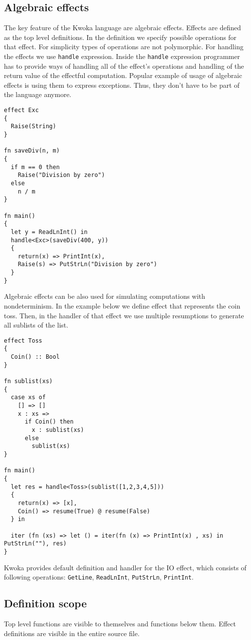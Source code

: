 \documentclass[a4paper]{article}
\begin{document}
\subsection*{Algebraic effects}
The key feature of the Kwoka language are algebraic effects.
Effects are defined as the top level definitions. In the definition we specify possible
operations for that effect. For simplicity types of operations are not polymorphic.
For handling the effects we use \verb+handle+ expression.
Inside the \verb+handle+ expression programmer has to provide ways of handling all of the
effect's operations and handling of the return value of the effectful computation.
Popular example of usage of algebraic effects is using them to
express exceptions. Thus, they don't have to be part of the language anymore.

\begin{verbatim}
effect Exc
{
  Raise(String)
}

fn saveDiv(n, m)
{
  if m == 0 then
    Raise("Division by zero")
  else
    n / m
}

fn main()
{
  let y = ReadLnInt() in
  handle<Exc>(saveDiv(400, y))
  {
    return(x) => PrintInt(x),
    Raise(s) => PutStrLn("Division by zero")
  }
}
\end{verbatim}
Algebraic effects can be also used for simulating computations with nondeterminism.
In the example below we define effect that represents the coin toss. Then, in the handler of that effect
we use multiple resumptions to generate all sublists of the list.
\begin{verbatim}
effect Toss
{
  Coin() :: Bool
}

fn sublist(xs)
{
  case xs of
    [] => []
    x : xs =>
      if Coin() then
        x : sublist(xs)
      else
        sublist(xs)
}

fn main()
{
  let res = handle<Toss>(sublist([1,2,3,4,5]))
  {
    return(x) => [x],
    Coin() => resume(True) @ resume(False)
  } in

  iter (fn (xs) => let () = iter(fn (x) => PrintInt(x) , xs) in PutStrLn(""), res)
}
\end{verbatim}
Kwoka provides default definition and handler for the IO effect,
which consists of following operations:
\verb+GetLine+, \verb+ReadLnInt+, \verb+PutStrLn+, \verb+PrintInt+.

\subsection*{Definition scope}
Top level functions are visible to themselves and functions below them.
Effect definitions are visible in the entire source file.
\end{document}
